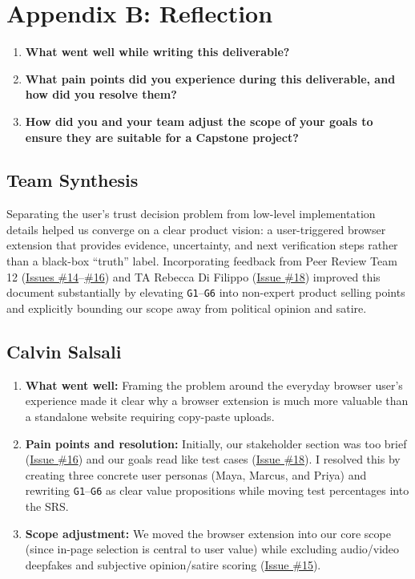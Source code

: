 \documentclass[11pt]{article}
\begin{document}
\newpage
\section*{Appendix B: Reflection}

\begin{enumerate}[leftmargin=*]
    \item \textbf{What went well while writing this deliverable?}
    \item \textbf{What pain points did you experience during this deliverable, and how did you resolve them?}
    \item \textbf{How did you and your team adjust the scope of your goals to ensure they are suitable for a Capstone project?}
\end{enumerate}

\subsection*{Team Synthesis}
Separating the user's trust decision problem from low-level implementation details helped us converge on a clear product vision: a user-triggered browser extension that provides evidence, uncertainty, and next verification steps rather than a black-box ``truth'' label. Incorporating feedback from Peer Review Team 12 (\href{https://github.com/richy1337/Verity/issues/14}{Issues \#14}--\href{https://github.com/richy1337/Verity/issues/16}{\#16}) and TA Rebecca Di Filippo (\href{https://github.com/richy1337/Verity/issues/18}{Issue \#18}) improved this document substantially by elevating \texttt{G1}--\texttt{G6} into non-expert product selling points and explicitly bounding our scope away from political opinion and satire.

\subsection*{Calvin Salsali}
\begin{enumerate}[leftmargin=*]
    \item \textbf{What went well:} Framing the problem around the everyday browser user's experience made it clear why a browser extension is much more valuable than a standalone website requiring copy-paste uploads.
    \item \textbf{Pain points and resolution:} Initially, our stakeholder section was too brief (\href{https://github.com/richy1337/Verity/issues/16}{Issue \#16}) and our goals read like test cases (\href{https://github.com/richy1337/Verity/issues/18}{Issue \#18}). I resolved this by creating three concrete user personas (Maya, Marcus, and Priya) and rewriting \texttt{G1}--\texttt{G6} as clear value propositions while moving test percentages into the SRS.
    \item \textbf{Scope adjustment:} We moved the browser extension into our core scope (since in-page selection is central to user value) while excluding audio/video deepfakes and subjective opinion/satire scoring (\href{https://github.com/richy1337/Verity/issues/15}{Issue \#15}).
\end{enumerate}
\end{document}
